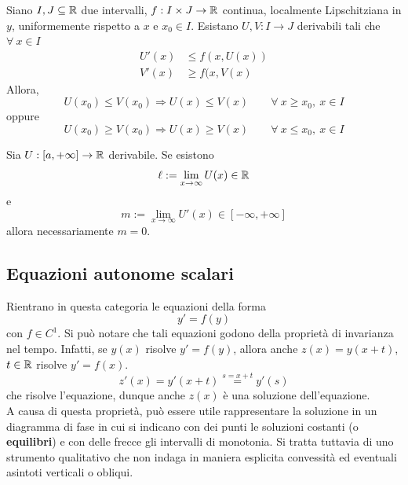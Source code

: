 \begin{theorem}
    Siano $I,J \subseteq \mathbb{R}$ due intervalli, $f:I\times J \to \mathbb{R}$ continua, localmente Lipschitziana in $y$, uniformemente rispetto a $x$ e $x_0 \in I$. Esistano $U,V: I \to J$ derivabili tali che $\forall\ x \in I$
    \begin{equation}
        \begin{aligned}
            U'(x) &\leq f(x, U(x))\\
            V'(x) & \geq f(x, V(x)
        \end{aligned}
    \end{equation}
    Allora,
    \begin{equation}
     U(x_0) \leq V(x_0) \Rightarrow U(x) \leq V(x) \qquad \forall\ x \geq x_0,\ x \in I \end{equation}
    oppure
    \begin{equation}
    U(x_0) \geq V(x_0) \Rightarrow U(x) \geq V(x) \qquad \forall\ x \leq x_0,\ x \in I \end{equation}
\end{theorem}
\begin{theorem}
    Sia $U:[a, +\infty]\to \mathbb{R}$ derivabile. Se esistono
    \begin{equation}
        \ell:=\lim_{x \to \infty}{U(x)} \in \mathbb{R}
    \end{equation}
    e 
    \begin{equation}
        m:=\lim_{x \to \infty}{U'(x)} \in [-\infty, +\infty]
    \end{equation}
    allora necessariamente $m=0$.
\end{theorem}
\subsection{Equazioni autonome scalari}
Rientrano in questa categoria le equazioni della forma
\begin{equation}
    y'=f(y)
\end{equation}
con $f \in C^1$.
Si può notare che tali equazioni godono della proprietà di invarianza nel tempo. Infatti, se $y(x)$ risolve $y'=f(y)$, allora anche $z(x)=y(x+t)$, $t\in \mathbb{R}$ risolve $y'=f(x)$.
\begin{equation}
    z'(x)=y'(x+t) \overset{s=x+t}{=}y'(s)
\end{equation}
che risolve l'equazione, dunque anche $z(x)$ è una soluzione dell'equazione.\\
A causa di questa proprietà, può essere utile rappresentare la soluzione in un diagramma di fase in cui si indicano con dei punti le soluzioni costanti (o \textbf{equilibri}) e con delle frecce gli intervalli di monotonia. Si tratta tuttavia di uno strumento qualitativo che non indaga in maniera esplicita convessità ed eventuali asintoti verticali o obliqui.